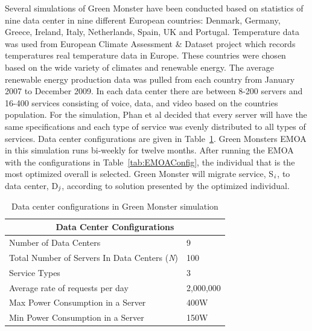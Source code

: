 \documentclass{sig-alternate}
\begin{document}
Several simulations of Green Monster have been conducted based on statistics of nine data center in nine different European countries: Denmark, Germany, Greece, Ireland, Italy, Netherlands, Spain, UK and Portugal. Temperature data was used from European Climate Assessment \& Dataset project which records temperatures real temperature data in Europe. These countries were chosen based on the wide variety of climates and renewable energy. The average renewable energy production data was pulled from each country from January 2007 to December 2009. In each data center there are between 8-200 servers and 16-400 services consisting of voice, data, and video based on the countries population. For the simulation, Phan et al decided that every server will have the same specifications and each type of service was evenly distributed to all types of services. Data center configurations are given in Table~\ref{tab:DCConfig}.  Green Monsters EMOA in this simulation runs bi-weekly for twelve months. After running the EMOA with the configurations in Table~\ref{tab:EMOAConfig}, the individual that is the most optimized overall is selected. Green Monster will migrate service, S$_{\text{\emph{i}}}$, to data center, D$_{\text{\emph{j}}}$, according to solution presented by the optimized individual.

\begin{table}[tb]
\begin{center}
\begin{tabular}{|l|l|}
    \hline
    \multicolumn{2}{|c|}{\textbf{Data Center Configurations}} \\
    \hline
    Number of Data Centers & 9 \\
    Total Number of Servers In Data Centers (\emph{N}) & 100 \\
    Service Types & 3 \\
    Average rate of requests per day & 2,000,000 \\
    Max Power Consumption in a Server & 400W \\
   	Min Power Consumption in a Server & 150W\\
    \hline
\end{tabular}
\caption{Data center configurations in Green Monster simulation}
\label{tab:DCConfig}
\end{center}
\end{table}
\end{document}
